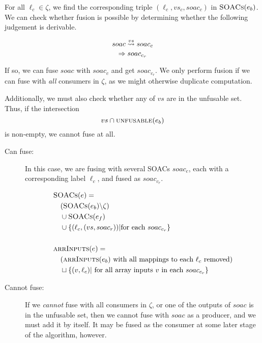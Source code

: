 \begin{description}[style=nextline]
  For all $\ell_{c} \in \zeta$, we find the corresponding triple
  $(\ell_{c},vs_{c},soac_{c})$ in $\textsc{SOACs}(e_{b})$.  We can check
  whether fusion is possible by determining whether the following
  judgement is derivable.

\[
   \fusesto
    {vs}
    {soac}
    {soac_{c}}
    {soac_{c_{r}}}
\]

If so, we can fuse $soac$ with $soac_{c}$ and get $soac_{c_{r}}$.  We
only perform fusion if we can fuse with \textit{all} consumers in
$\zeta$, as we might otherwise duplicate computation.

Additionally, we must also check whether any of $vs$ are in the
unfusable set.  Thus, if the intersection
\[
vs \cap \textsc{unfusable}(e_{b})
\]
is non-empty, we cannot fuse at all.

\begin{description}
\item[Can fuse:]

  In this case, we are fusing with several SOACs $soac_{c}$, each with
  a corresponding label $\ell_{c}$, and fused as $soac_{c_{r}}$.

\begin{align*}
  & \textsc{SOACs}(e) =\\
  & \quad (\textsc{SOACs}(e_{b}) \backslash \zeta)\\
  & \quad \cup \textsc{SOACs}(e_{f})\\
  & \quad \cup \{ (\ell_{c}, (vs, soac_{r})) | \textrm{for each $soac_{c_{r}}$} \}\\
  \\
  & \textsc{arrInputs}(e) =\\
  & \quad (\textrm{$\textsc{arrInputs}(e_{b})$ with all mappings to each $\ell_{c}$ removed}) \\
  & \quad \sqcup \{ (v,\ell_{c}) |\ \textrm{for all array inputs $v$ in each $soac_{c_{r}}$} \}
\end{align*}

\item[Cannot fuse:]

  If we \textit{cannot} fuse with all consumers in $\zeta$, or one of
  the outputs of $soac$ is in the unfusable set, then we cannot fuse
  with $soac$ as a producer, and we must add it by itself.  It may be
  fused as the consumer at some later stage of the algorithm, however.


\end{description}
\end{description}
